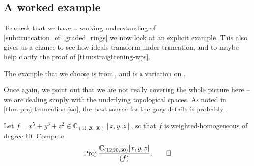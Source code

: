 \documentclass[10pt,notitlepage]{article}
\numberwithin{equation}{subsection}
\DeclareMathOperator{\proj}{Proj}
\newcommand{\cc}{\mathbb{C}}
\begin{document}
        


    



    \subsection{A worked example} %
    \label{sub:a_worked_example}
    
    To check that we have a working understanding of \cref{sub:truncation_of_graded_rings} we now look at an explicit example.
    This also gives us a chance to see how ideals transform under truncation, and to maybe help clarify the proof of \cref{thm:straightening-wps}.

    The example that we choose is from \cite[Exercise~5,~Section~6.5]{Tevelev:jdT35_ao}, and is a variation on \cite[Example~3.7]{Reid:2002uy}.

    Once again, we point out that we are not really covering the whole picture here -- we are dealing simply with the underlying topological spaces.
    As noted in \cref{thm:proj-truncation-iso}, the best source for the gory details is probably \cite[Proposition~(2.4.7)]{Grothendieck:1961tr}.

    \begin{example}\label{ex:that-worked-example}
        Let $f=x^5+y^3+z^2\in\cc_{(12,20,30)}[x,y,z]$, so that $f$ is weighted-homogeneous of degree $60$.
        Compute
        \[
            \proj\frac{\cc_{(12,20,30)}[x,y,z]}{(f)}.\qedhere
        \]
    \end{example}
\end{document}
